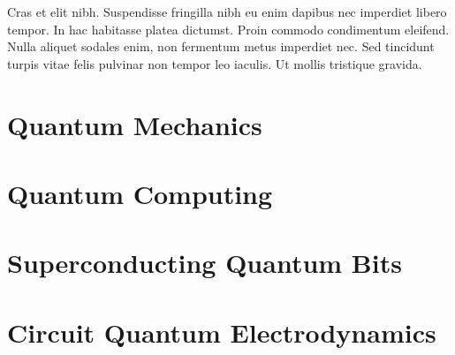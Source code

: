 Cras et elit nibh. Suspendisse fringilla nibh eu enim dapibus nec imperdiet libero tempor. In hac habitasse platea dictumst. Proin commodo condimentum eleifend. Nulla aliquet sodales enim, non fermentum metus imperdiet nec. Sed tincidunt turpis vitae felis pulvinar non tempor leo iaculis. Ut mollis tristique gravida. 

\section{Quantum Mechanics}

\section{Quantum Computing}

\section{Superconducting Quantum Bits}

\section{Circuit Quantum Electrodynamics}
